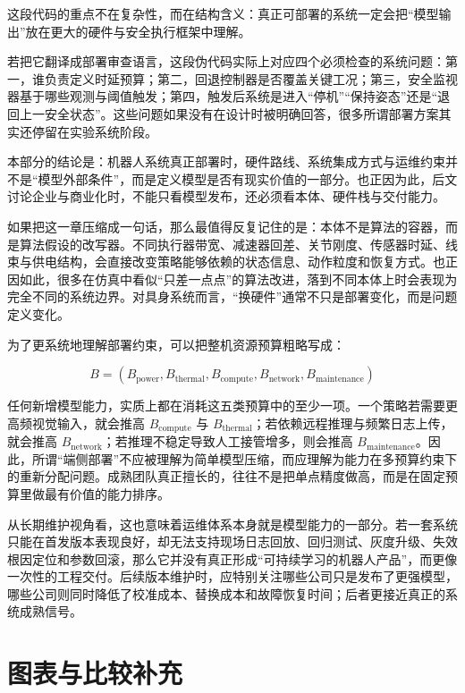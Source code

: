 这段代码的重点不在复杂性，而在结构含义：真正可部署的系统一定会把“模型输出”放在更大的硬件与安全执行框架中理解。

若把它翻译成部署审查语言，这段伪代码实际上对应四个必须检查的系统问题：第一，谁负责定义时延预算；第二，回退控制器是否覆盖关键工况；第三，安全监视器基于哪些观测与阈值触发；第四，触发后系统是进入“停机”“保持姿态”还是“退回上一安全状态”。这些问题如果没有在设计时被明确回答，很多所谓部署方案其实还停留在实验系统阶段。

本部分的结论是：机器人系统真正部署时，硬件路线、系统集成方式与运维约束并不是“模型外部条件”，而是定义模型是否有现实价值的一部分。也正因为此，后文讨论企业与商业化时，不能只看模型发布，还必须看本体、硬件栈与交付能力。

如果把这一章压缩成一句话，那么最值得反复记住的是：本体不是算法的容器，而是算法假设的改写器。不同执行器带宽、减速器回差、关节刚度、传感器时延、线束与供电结构，会直接改变策略能够依赖的状态信息、动作粒度和恢复方式。也正因如此，很多在仿真中看似“只差一点点”的算法改进，落到不同本体上时会表现为完全不同的系统边界。对具身系统而言，“换硬件”通常不只是部署变化，而是问题定义变化。

为了更系统地理解部署约束，可以把整机资源预算粗略写成：

\begingroup
\scriptsize
\begin{equation*}
B = (B_{\text{power}}, B_{\text{thermal}}, B_{\text{compute}}, B_{\text{network}}, B_{\text{maintenance}})
\end{equation*}
\endgroup

任何新增模型能力，实质上都在消耗这五类预算中的至少一项。一个策略若需要更高频视觉输入，就会推高 \(B_{\text{compute}}\) 与 \(B_{\text{thermal}}\)；若依赖远程推理与频繁日志上传，就会推高 \(B_{\text{network}}\)；若推理不稳定导致人工接管增多，则会推高 \(B_{\text{maintenance}}\)。因此，所谓“端侧部署”不应被理解为简单模型压缩，而应理解为能力在多预算约束下的重新分配问题。成熟团队真正擅长的，往往不是把单点精度做高，而是在固定预算里做最有价值的能力排序。

从长期维护视角看，这也意味着运维体系本身就是模型能力的一部分。若一套系统只能在首发版本表现良好，却无法支持现场日志回放、回归测试、灰度升级、失效根因定位和参数回滚，那么它并没有真正形成“可持续学习的机器人产品”，而更像一次性的工程交付。后续版本维护时，应特别关注哪些公司只是发布了更强模型，哪些公司则同时降低了校准成本、替换成本和故障恢复时间；后者更接近真正的系统成熟信号。

\section*{图表与比较补充}

